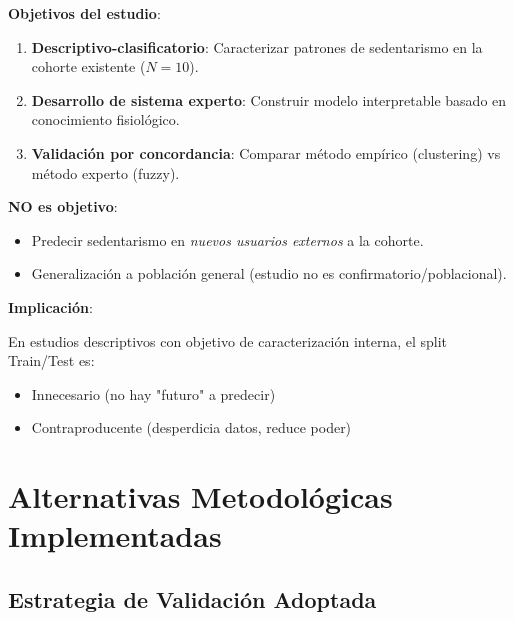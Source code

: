 \documentclass[12pt,letterpaper,twoside]{report}
\begin{document}
\begin{reglabox}
\textbf{Objetivos del estudio}:

\begin{enumerate}[noitemsep]
    \item \textbf{Descriptivo-clasificatorio}: Caracterizar patrones de sedentarismo en la cohorte existente ($N=10$).
    \item \textbf{Desarrollo de sistema experto}: Construir modelo interpretable basado en conocimiento fisiológico.
    \item \textbf{Validación por concordancia}: Comparar método empírico (clustering) vs método experto (fuzzy).
\end{enumerate}

\textbf{NO es objetivo}:
\begin{itemize}[noitemsep]
    \item Predecir sedentarismo en \textit{nuevos usuarios externos} a la cohorte.
    \item Generalización a población general (estudio no es confirmatorio/poblacional).
\end{itemize}

\textbf{Implicación}:

En estudios descriptivos con objetivo de caracterización interna, el split Train/Test es:
\begin{itemize}[noitemsep]
    \item Innecesario (no hay "futuro" a predecir)
    \item Contraproducente (desperdicia datos, reduce poder)
\end{itemize}
\end{reglabox}

\section{Alternativas Metodológicas Implementadas}

\subsection{Estrategia de Validación Adoptada}
\end{document}
